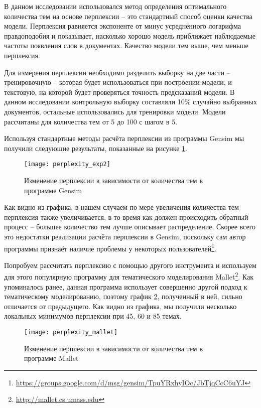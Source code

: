 В данном исследовании использовался метод определения оптимального количества тем на основе перплексии -- это стандартный способ оценки качества модели. Перплексия равняется экспоненте от минус усреднённого логарифма правдоподобия и показывает, насколько хорошо модель приближает наблюдаемые частоты появления слов в документах. Качество модели тем выше, чем меньше перплексия.

Для измерения перплексии необходимо разделить выборку на две части -- тренировочную -- которая будет использоваться при построении модели, и текстовую, на которой будет проверяться точность предсказаний модели. В данном исследовании контрольную выборку составляли 10\% случайно выбранных документов, остальные использовались для тренировки модели. Модели рассчитаны для количества тем от 5 до 100 с шагом в 5.

Используя стандартные методы расчёта перплексии из программы Gensim мы получили следующие результаты, показанные на рисунке \ref{fig:perplexity_gensim}.

\begin{figure}
	\centering
    \texttt{[image: perplexity\_exp2]}
    \caption{Изменение перплексии в зависимости от количества тем в программе Gensim}
    \label{fig:perplexity_gensim}
\end{figure}

Как видно из графика, в нашем случаем по мере увеличения количества тем перплексия также увеличивается, в то время как должен происходить обратный процесс -- большее количество тем лучше описывает распределение. Скорее всего это недостатки реализации расчёта перплексии в Gensim, поскольку сам автор программы признаёт наличие проблемы у некоторых пользователей\footnote{\href{https://groups.google.com/d/msg/gensim/TpuYRxhyIOc/JbTjqCcC6uYJ}{https://groups.google.com/d/msg/gensim/TpuYRxhyIOc/JbTjqCcC6uYJ}}.

Попробуем рассчитать перплексию с помощью другого инструмента и используем для этого популярную программу для тематического моделирования Mallet\footnote{\href{http://mallet.cs.umass.edu}{http://mallet.cs.umass.edu}}. Как упоминалось ранее, данная программа использует совершенно другой подход к тематическому моделированию, поэтому график \ref{fig:perplexity_mallet}, полученный в ней, сильно отличается от предыдущего. Как видно из графика, мы получили несколько локальных минимумов перплексии при 45, 60 и 85 темах.

\begin{figure}
	\centering
    \texttt{[image: perplexity\_mallet]}
    \caption{Изменение перплексии в зависимости от количества тем в программе Mallet}
    \label{fig:perplexity_mallet}
\end{figure}

